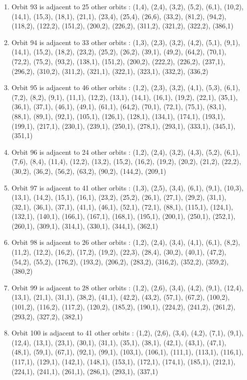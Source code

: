 \documentclass[12pt]{article}
\begin{document}
\begin{enumerate}
\item Orbit 93 is adjacent to 25 other orbits : (1,4), (2,4), (3,2), (5,2), (6,1), (10,2), (14,1), (15,3), (18,1), (21,1), (23,4), (25,4), (26,6), (33,2), (81,2), (94,2), (118,2), (122,2), (151,2), (200,2), (226,2), (311,2), (321,2), (322,2), (386,1)
\item Orbit 94 is adjacent to 33 other orbits : (1,3), (2,3), (3,2), (4,2), (5,1), (9,1), (14,1), (15,2), (18,2), (23,2), (25,2), (26,2), (39,1), (49,2), (64,2), (70,1), (72,2), (75,2), (93,2), (138,1), (151,2), (200,2), (222,2), (226,2), (237,1), (296,2), (310,2), (311,2), (321,1), (322,1), (323,1), (332,2), (336,2)
\item Orbit 95 is adjacent to 46 other orbits : (1,2), (2,3), (3,2), (4,1), (5,3), (6,1), (7,2), (8,2), (9,1), (11,1), (12,2), (13,1), (14,1), (16,1), (19,2), (22,1), (35,1), (36,1), (37,1), (46,1), (49,1), (61,1), (64,2), (70,1), (72,1), (75,1), (83,1), (88,1), (89,1), (92,1), (105,1), (126,1), (128,1), (134,1), (174,1), (193,1), (199,1), (217,1), (230,1), (239,1), (250,1), (278,1), (293,1), (333,1), (345,1), (351,1)
\item Orbit 96 is adjacent to 24 other orbits : (1,2), (2,4), (3,2), (4,3), (5,2), (6,1), (7,6), (8,4), (11,4), (12,2), (13,2), (15,2), (16,2), (19,2), (20,2), (21,2), (22,2), (30,2), (36,2), (56,2), (63,2), (90,2), (144,2), (209,1)
\item Orbit 97 is adjacent to 41 other orbits : (1,3), (2,5), (3,4), (6,1), (9,1), (10,3), (13,1), (14,2), (15,1), (16,1), (23,2), (25,2), (26,1), (27,1), (29,2), (31,1), (32,1), (36,1), (37,1), (41,1), (46,1), (52,1), (72,1), (88,1), (115,1), (124,1), (132,1), (140,1), (166,1), (167,1), (168,1), (195,1), (200,1), (250,1), (252,1), (260,1), (309,1), (314,1), (330,1), (344,1), (362,1)
\item Orbit 98 is adjacent to 26 other orbits : (1,2), (2,4), (3,4), (4,1), (6,1), (8,2), (11,2), (12,2), (16,2), (17,2), (19,2), (22,3), (28,4), (30,2), (40,1), (47,2), (54,2), (55,2), (176,2), (193,2), (206,2), (283,2), (316,2), (352,2), (359,2), (380,2)
\item Orbit 99 is adjacent to 28 other orbits : (1,2), (2,6), (3,4), (4,2), (9,1), (12,4), (13,1), (21,1), (31,1), (38,2), (41,1), (42,2), (43,2), (57,1), (67,2), (100,2), (101,2), (116,2), (117,2), (120,2), (185,2), (190,1), (224,2), (241,2), (261,2), (293,2), (327,2), (382,1)
\item Orbit 100 is adjacent to 41 other orbits : (1,2), (2,6), (3,4), (4,2), (7,1), (9,1), (12,4), (13,1), (23,1), (30,1), (31,1), (35,1), (38,1), (42,1), (43,1), (47,1), (48,1), (59,1), (67,1), (92,1), (99,1), (103,1), (106,1), (111,1), (113,1), (116,1), (117,1), (129,1), (142,1), (148,1), (153,1), (172,1), (174,1), (185,1), (212,1), (224,1), (241,1), (261,1), (286,1), (293,1), (337,1)

\end{enumerate}
\end{document}
